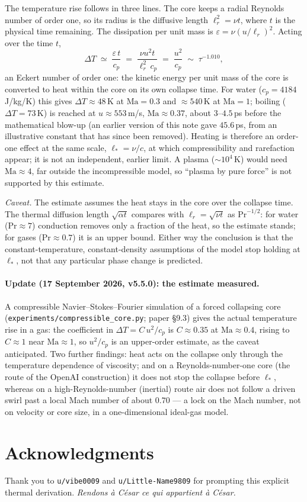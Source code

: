 \documentclass[11pt]{article}
\begin{document}
The temperature rise follows in three lines. The core keeps a radial Reynolds number of order one, so its radius is the diffusive length $\ell_r^2=\nu t$, where $t$ is the physical time remaining. The dissipation per unit mass is $\varepsilon=\nu(u/\ell_r)^2$. Acting over the time $t$,
\begin{equation}
    \Delta T \;\simeq\; \frac{\varepsilon\,t}{c_p} \;=\; \frac{\nu u^2 t}{\ell_r^2\,c_p} \;=\; \frac{u^2}{c_p}\;\sim\;\tau^{-1.010},
\end{equation}
an Eckert number of order one: the kinetic energy per unit mass of the core is converted to heat within the core on its own collapse time. For water ($c_p=4184$\,J/kg/K) this gives $\Delta T\approx48$\,K at $\mathrm{Ma}=0.3$ and $\approx540$\,K at $\mathrm{Ma}=1$; boiling ($\Delta T=73$\,K) is reached at $u\approx553$\,m/s, $\mathrm{Ma}\approx0.37$, about $3$--$4.5$\,ps before the mathematical blow-up (an earlier version of this note gave $45.6$\,ps, from an illustrative constant that has since been removed). Heating is therefore an order-one effect at the same scale, $\ell_*=\nu/c$, at which compressibility and rarefaction appear; it is not an independent, earlier limit. A plasma ($\sim10^4$\,K) would need $\mathrm{Ma}\approx4$, far outside the incompressible model, so ``plasma by pure force'' is not supported by this estimate.

\emph{Caveat.} The estimate assumes the heat stays in the core over the collapse time. The thermal diffusion length $\sqrt{\alpha t}$ compares with $\ell_r=\sqrt{\nu t}$ as $\mathrm{Pr}^{-1/2}$: for water ($\mathrm{Pr}\approx7$) conduction removes only a fraction of the heat, so the estimate stands; for gases ($\mathrm{Pr}\approx0.7$) it is an upper bound. Either way the conclusion is that the constant-temperature, constant-density assumptions of the model stop holding at $\ell_*$, not that any particular phase change is predicted.

\paragraph{Update (17 September 2026, v5.5.0): the estimate measured.} A compressible Navier--Stokes--Fourier simulation of a forced collapsing core (\texttt{experiments/compressible\_core.py}; paper \S9.3) gives the actual temperature rise in a gas: the coefficient in $\Delta T = C\,u^2/c_p$ is $C\approx0.35$ at $\mathrm{Ma}\approx0.4$, rising to $C\approx1$ near $\mathrm{Ma}\approx1$, so $u^2/c_p$ is an upper-order estimate, as the caveat anticipated. Two further findings: heat acts on the collapse only through the temperature dependence of viscosity; and on a Reynolds-number-one core (the route of the OpenAI construction) it does not stop the collapse before $\ell_*$, whereas on a high-Reynolds-number (inertial) route air does not follow a driven swirl past a local Mach number of about $0.70$ --- a lock on the Mach number, not on velocity or core size, in a one-dimensional ideal-gas model.

\section{Acknowledgments}
Thank you to \texttt{u/vibe0009} and \texttt{u/Little-Name9809} for prompting this explicit thermal derivation. \textit{Rendons \`a C\'esar ce qui appartient \`a C\'esar.}
\end{document}

